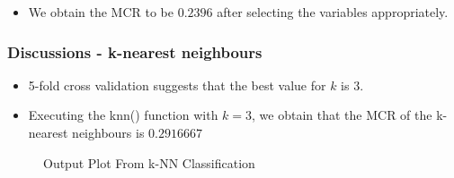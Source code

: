 \documentclass{beamer}
\begin{document}
\begin{frame}
    
    \begin{table}[h!]
        \centering
        \caption{Binary Logistic Regression Reduced Model Output with Odds Ratio}
        \label{tab:BinLogRegA}
    \end{table}
    \begin{itemize}
        \item We obtain the MCR to be $0.2396$ after selecting the variables appropriately. 
    \end{itemize}


\end{frame}



\begin{frame}
    \frametitle{Discussions - k-nearest neighbours}
        \begin{itemize}
            \setlength\itemsep{1em}
            \item 5-fold cross validation suggests that the best value for $k$ is $3$.
            \item Executing the knn() function with $k=3$, we obtain that the MCR of the k-nearest neighbours is $0.2916667$
        \end{itemize}
        \begin{figure}[h!]
            \centering
            \caption{Output Plot From k-NN Classification} 
            \label{fig:KNNPlot}
        \end{figure}
\end{frame}
\end{document}
